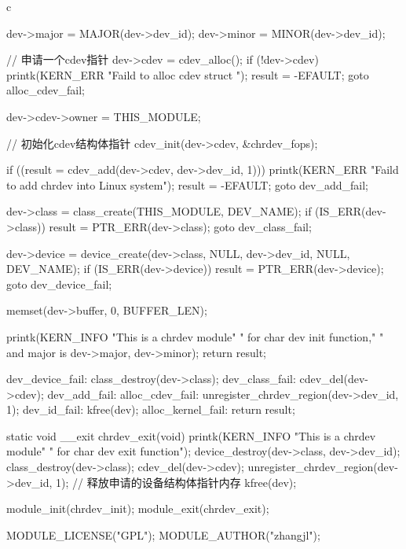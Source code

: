 \begin{code-block}{c}
{        dev->major = MAJOR(dev->dev_id);
        dev->minor = MINOR(dev->dev_id);

        // 申请一个cdev指针
        dev->cdev = cdev_alloc();
        if (!dev->cdev) {
                printk(KERN_ERR "Faild to alloc cdev struct \n");
                result = -EFAULT;
                goto alloc_cdev_fail;
        }

        dev->cdev->owner = THIS_MODULE;

        // 初始化cdev结构体指针
        cdev_init(dev->cdev, &chrdev_fops);

        if ((result = cdev_add(dev->cdev, dev->dev_id, 1))) {
                printk(KERN_ERR "Faild to add chrdev into Linux system\n");
                result = -EFAULT;
                goto dev_add_fail;
        }

        dev->class = class_create(THIS_MODULE, DEV_NAME);
        if (IS_ERR(dev->class)) {
                result = PTR_ERR(dev->class);
                goto dev_class_fail;
        }

        dev->device = device_create(dev->class, NULL,
                dev->dev_id, NULL, DEV_NAME);
        if (IS_ERR(dev->device)) {
                result = PTR_ERR(dev->device);
                goto dev_device_fail;
        }

        memset(dev->buffer, 0, BUFFER_LEN);

        printk(KERN_INFO "This is a chrdev module"
                " for char dev init function,"
                " and major is %
                dev->major, dev->minor);
        return result;

dev_device_fail:
        class_destroy(dev->class);
dev_class_fail:
        cdev_del(dev->cdev);
dev_add_fail:
alloc_cdev_fail:
        unregister_chrdev_region(dev->dev_id, 1);
dev_id_fail:
        kfree(dev);
alloc_kernel_fail:
        return result;
}

static void __exit chrdev_exit(void)
{
        printk(KERN_INFO "This is a chrdev module"
                " for char dev exit function\n");
        device_destroy(dev->class, dev->dev_id);
        class_destroy(dev->class);
        cdev_del(dev->cdev);
        unregister_chrdev_region(dev->dev_id, 1);
        // 释放申请的设备结构体指针内存
        kfree(dev);
}

module_init(chrdev_init);
module_exit(chrdev_exit);

MODULE_LICENSE("GPL");
MODULE_AUTHOR("zhangjl");
\end{code-block}

